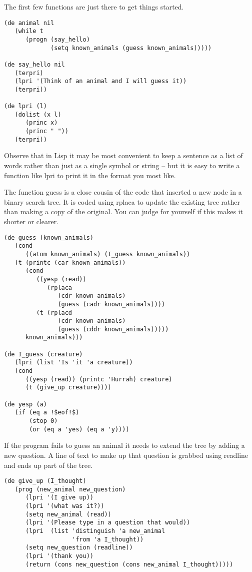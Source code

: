 The first few functions are just there to get things started.
{\small\begin{verbatim}
(de animal nil
   (while t
      (progn (say_hello)
             (setq known_animals (guess known_animals)))))

(de say_hello nil
   (terpri)
   (lpri '(Think of an animal and I will guess it))
   (terpri))

(de lpri (l)
   (dolist (x l)
      (princ x)
      (princ " "))
   (terpri))
\end{verbatim}}
Observe that in Lisp it may be most convenient to keep a sentence as
a list of words rather than just as a single symbol or string -- but it
is easy to write a function like {\tx lpri} to print it in the format
you most like.

The function {\tx guess} is a close cousin of the code that inserted a
new node in a binary search tree. It is coded using {\tx rplaca} to update
the existing tree rather than making a copy of the original. You can judge for
yourself if this makes it shorter or clearer.
{\small\begin{verbatim}
(de guess (known_animals)
   (cond
      ((atom known_animals) (I_guess known_animals))
   (t (printc (car known_animals))   
      (cond
         ((yesp (read))
            (rplaca
               (cdr known_animals)
               (guess (cadr known_animals))))
         (t (rplacd
               (cdr known_animals)
               (guess (cddr known_animals)))))
      known_animals)))

(de I_guess (creature)
   (lpri (list 'Is 'it 'a creature))
   (cond
      ((yesp (read)) (printc 'Hurrah) creature)
      (t (give_up creature))))

(de yesp (a)
   (if (eq a !$eof!$)
       (stop 0)
       (or (eq a 'yes) (eq a 'y))))
\end{verbatim}}

If the program fails to guess an animal it needs to extend the tree
by adding a new question. A line of text to make up that question is
grabbed using {\tx readline} and ends up part of the tree.
{\small\begin{verbatim}
(de give_up (I_thought)
   (prog (new_animal new_question)
      (lpri '(I give up))
      (lpri '(what was it?))
      (setq new_animal (read))
      (lpri '(Please type in a question that would))
      (lpri  (list 'distinguish 'a new_animal
                   'from 'a I_thought))
      (setq new_question (readline))
      (lpri '(thank you))
      (return (cons new_question (cons new_animal I_thought)))))
\end{verbatim}}

